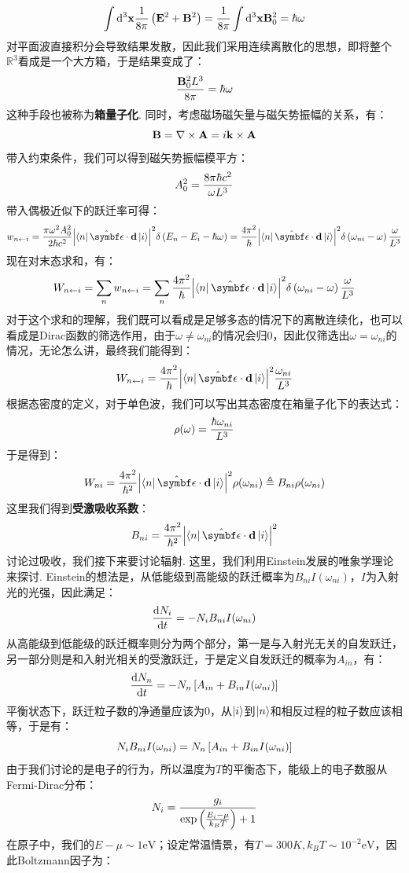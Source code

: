 \[
\int\dd^{3}\mathbf{x} \frac{1}{8\pi}\left({\mathbf{E}^{2}+\mathbf{B}^{2}}\right) = \frac{1}{8\pi}\int\dd^{3}\mathbf{x}\mathbf{B}_{0}^{2} = \hbar\omega
\]
对平面波直接积分会导致结果发散，因此我们采用连续离散化的思想，即将整个\(\mathbb{R}^{3}\)看成是一个大方箱，于是结果变成了：
\[
\frac{\mathbf{B}_{0}^{2}L^{3}}{8\pi} = \hbar\omega 
\]
这种手段也被称为\textbf{箱量子化}. 同时，考虑磁场磁矢量与磁矢势振幅的关系，有：
\[
\mathbf{B} = \nabla\times\mathbf{A} = i\mathbf{k}\times\mathbf{A} 
\]
带入约束条件，我们可以得到磁矢势振幅模平方：
\[
A_{0}^{2} = \frac{8\pi\hbar c^{2}}{\omega L^{3}}
\]
带入偶极近似下的跃迁率可得：
\[
w_{\jump{n}{i}} = \frac{\pi\omega^{2}A_{0}^{2}}{2\hh c^{2}}\abs{\bra{n}\uv{\epsilon}\cdot\mathbf{d}\ket{i}}^{2}\delta\br{E_{n}-E_{i}-\hh\omega} = \frac{4\pi^{2}}{\hh}\abs{\bra{n}\uv{\epsilon}\cdot\mathbf{d}\ket{i}}^{2}\delta\br{\omega_{ni}-\omega}\frac{\omega}{L^{3}}
\]
现在对末态求和，有：
\[
W_{\jump{n}{i}} = \sum_{n}w_{\jump{n}{i}} = \sum_{n}\frac{4\pi^{2}}{\hh}\abs{\bra{n}\uv{\epsilon}\cdot\mathbf{d}\ket{i}}^{2}\delta\br{\omega_{ni}-\omega}\frac{\omega}{L^{3}}
\]
对于这个求和的理解，我们既可以看成是足够多态的情况下的离散连续化，也可以看成是Dirac函数的筛选作用，由于\(\omega\neq\omega_{ni}\)的情况会归0，因此仅筛选出\(\omega=\omega_{ni}\)的情况，无论怎么讲，最终我们能得到：
\[
W_{\jump{n}{i}} = \frac{4\pi^{2}}{\hh}\abs{\bra{n}\uv{\epsilon}\cdot\mathbf{d}\ket{i}}^{2}\frac{\omega_{ni}}{L^{3}}
\]
根据态密度的定义，对于单色波，我们可以写出其态密度在箱量子化下的表达式：
\[
\rho(\omega) = \frac{\hbar\omega_{ni}}{L^{3}}
\]
于是得到：
\[
W_{ni} = \frac{4\pi^{2}}{\hh^{2}}\abs{\bra{n}\uv{\epsilon}\cdot\mathbf{d}\ket{i}}^{2}\rho(\omega_{ni})\triangleq B_{ni}\rho(\omega_{ni})
\]
这里我们得到\textbf{受激吸收系数}：
\[
B_{ni} = \frac{4\pi^{2}}{\hh^{2}}\abs{\bra{n}\uv{\epsilon}\cdot\mathbf{d}\ket{i}}^{2}
\]
讨论过吸收，我们接下来要讨论辐射. 这里，我们利用Einstein发展的唯象学理论来探讨. Einstein的想法是，从低能级到高能级的跃迁概率为\(B_{ni}I(\omega_{ni})\)，\(I\)为入射光的光强，因此满足：
\[
\frac{\mathrm{d} N_{i}}{\mathrm{d}t} = -N_{i}B_{ni}I(\omega_{ni})
\]
从高能级到低能级的跃迁概率则分为两个部分，第一是与入射光无关的自发跃迁，另一部分则是和入射光相关的受激跃迁，于是定义自发跃迁的概率为\(A_{in}\)，有：
\[
\frac{\mathrm{d} N_{n}}{\mathrm{d}t} = -N_{n}\left[{A_{in} + B_{in}I(\omega_{ni})}\right]
\]
平衡状态下，跃迁粒子数的净通量应该为0，从\(\ket{i}\)到\(\ket{n}\)和相反过程的粒子数应该相等，于是有：
\[
N_{i}B_{ni}I(\omega_{ni}) = N_{n}\left[{A_{in} + B_{in}I(\omega_{ni})}\right]
\]
由于我们讨论的是电子的行为，所以温度为\(T\)的平衡态下，能级上的电子数服从Fermi-Dirac分布：
\[
N_{i} = \frac{g_{i}}{\exp\left({\frac{E_{i}-\mu}{k_{B}T}}\right) + 1}
\]
在原子中，我们的\(E-\mu\sim 1\mathrm{eV}\)；设定常温情景，有\(T=300K,k_{B}T\sim 10^{-2}\mathrm{eV}\)，因此Boltzmann因子为：
